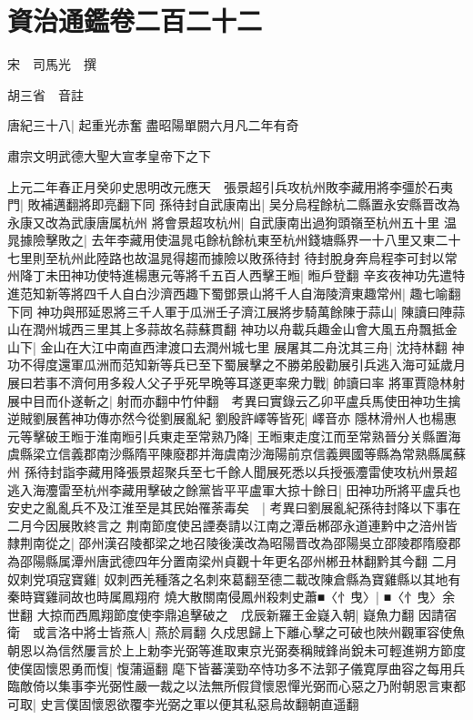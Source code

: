 \chapter{資治通鑑卷二百二十二}
宋　司馬光　撰

胡三省　音註

唐紀三十八|{
	起重光赤奮盡昭陽單閼六月凡二年有奇}


肅宗文明武德大聖大宣孝皇帝下之下

上元二年春正月癸卯史思明改元應天　張景超引兵攻杭州敗李藏用將李彊於石夷門|{
	敗補邁翻將即亮翻下同}
孫待封自武康南出|{
	吴分烏程餘杭二縣置永安縣晋改為永康又改為武康唐属杭州}
將會景超攻杭州|{
	自武康南出過狗頭嶺至杭州五十里}
温晁據險擊敗之|{
	去年李藏用使温晁屯餘杭餘杭東至杭州錢塘縣界一十八里又東二十七里則至杭州此陸路也故温晁得趨而據險以敗孫待封}
待封脫身奔烏程李可封以常州降丁未田神功使特進楊惠元等將千五百人西擊王暅|{
	暅戶登翻}
辛亥夜神功先遣特進范知新等將四千人自白沙濟西趣下蜀鄧景山將千人自海陵濟東趣常州|{
	趣七喻翻下同}
神功與邢延恩將三千人軍于瓜洲壬子濟江展將步騎萬餘陳于蒜山|{
	陳讀曰陣蒜山在潤州城西三里其上多蒜故名蒜蘇貫翻}
神功以舟載兵趣金山會大風五舟飄抵金山下|{
	金山在大江中南直西津渡口去潤州城七里}
展屠其二舟沈其三舟|{
	沈持林翻}
神功不得度還軍瓜洲而范知新等兵已至下蜀展擊之不勝弟殷勸展引兵逃入海可延歲月展曰若事不濟何用多殺人父子乎死早晩等耳遂更率衆力戰|{
	帥讀曰率}
將軍賈隐林射展中目而仆遂斬之|{
	射而亦翻中竹仲翻　考異曰實錄云乙卯平盧兵馬使田神功生擒逆賊劉展舊神功傳亦然今從劉展亂紀}
劉殷許嶧等皆死|{
	嶧音亦}
隱林滑州人也楊惠元等擊破王暅于淮南暅引兵東走至常熟乃降|{
	王暅東走度江而至常熟晉分关縣置海虞縣梁立信義郡南沙縣隋平陳廢郡并海虞南沙海陽前京信義興國等縣為常熟縣属蘇州}
孫待封詣李藏用降張景超聚兵至七千餘人聞展死悉以兵授張灋雷使攻杭州景超逃入海灋雷至杭州李藏用擊破之餘黨皆平平盧軍大掠十餘日|{
	田神功所將平盧兵也}
安史之亂亂兵不及江淮至是其民始罹荼毒矣　|{
	考異曰劉展亂紀孫待封降以下事在二月今因展敗終言之}
荆南節度使呂諲奏請以江南之潭岳郴邵永道連黔中之涪州皆隸荆南從之|{
	邵州漢召陵都梁之地召陵後漢改為昭陽晋改為邵陽吳立邵陵郡隋廢郡為邵陽縣属潭州唐武德四年分置南梁州貞觀十年更名邵州郴丑林翻黔其今翻}
二月奴刺党項寇寶雞|{
	奴刺西羌種落之名刺來葛翻至德二載改陳倉縣為寶雞縣以其地有秦時寶雞祠故也時属鳳翔府}
燒大散關南侵鳳州殺刺史蕭■〈忄曳〉|{
	■〈忄曳〉余世翻}
大掠而西鳳翔節度使李鼎追擊破之　戊辰新羅王金嶷入朝|{
	嶷魚力翻}
因請宿衛　或言洛中將士皆燕人|{
	燕於肩翻}
久戍思歸上下離心擊之可破也陜州觀軍容使魚朝恩以為信然屢言於上上勅李光弼等進取東京光弼奏稱賊鋒尚銳未可輕進朔方節度使僕固懷恩勇而愎|{
	愎蒲逼翻}
麾下皆蕃漢勁卒恃功多不法郭子儀寛厚曲容之每用兵臨敵倚以集事李光弼性嚴一裁之以法無所假貸懷恩憚光弼而心惡之乃附朝恩言東都可取|{
	史言僕固懷恩欲覆李光弼之軍以便其私惡烏故翻朝直遥翻}
